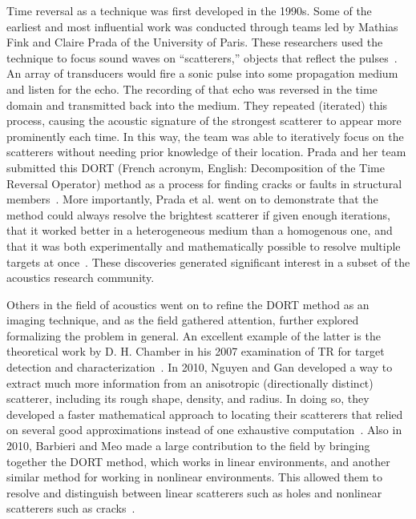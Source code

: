 Time reversal as a technique was first developed in the 1990s. Some of the earliest and most influential work was conducted through teams led by Mathias Fink and Claire Prada of the University of Paris. These researchers used the technique to focus sound waves on ``scatterers,'' objects that reflect the pulses~\cite{prada_iterative_1991}. An array of transducers would fire a sonic pulse into some propagation medium and listen for the echo. The recording of that echo was reversed in the time domain and transmitted back into the medium. They repeated (iterated) this process, causing the acoustic signature of the strongest scatterer to appear more prominently each time. In this way, the team was able to iteratively focus on the scatterers without needing prior knowledge of their location. Prada and her team submitted this DORT (French acronym, English: Decomposition of the Time Reversal Operator) method as a process for finding cracks or faults in structural members~\cite{prada_iterative_1991}. More importantly, Prada et al. went on to demonstrate that the method could always resolve the brightest scatterer if given enough iterations, that it worked better in a heterogeneous medium than a homogenous one, and that it was both experimentally and mathematically possible to resolve multiple targets at once~\cite{prada_decomposition_1996}. These discoveries generated significant interest in a subset of the acoustics research community.

Others in the field of acoustics went on to refine the DORT method as an imaging technique, and as the field gathered attention, further explored formalizing the problem in general. An excellent example of the latter is the theoretical work by D. H. Chamber in his 2007 examination of TR for target detection and characterization~\cite{chambers_target_2007}. In 2010, Nguyen and Gan developed a way to extract much more information from an anisotropic (directionally distinct) scatterer, including its rough shape, density, and radius. In doing so, they developed a faster mathematical approach to locating their scatterers that relied on several good approximations instead of one exhaustive computation~\cite{nguyen_dort_2010}. Also in 2010, Barbieri and Meo made a large contribution to the field by bringing together the DORT method, which works in linear environments, and another similar method for working in nonlinear environments. This allowed them to resolve and distinguish between linear scatterers such as holes and nonlinear scatterers such as cracks~\cite{barbieri_time_2010}.

